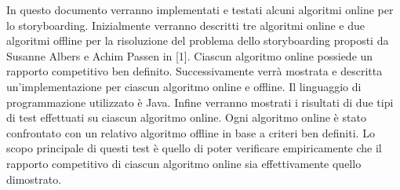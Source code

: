\documentclass[openany,titlepage,fleqn,
	headinclude,12pt,a4paper,BCOR5mm,footinclude]{scrbook}
\begin{document}
In questo documento verranno implementati e testati alcuni algoritmi online per lo storyboarding. Inizialmente verranno descritti tre algoritmi online e due algoritmi offline per la risoluzione del problema dello storyboarding proposti da Susanne Albers e Achim Passen in [1]. Ciascun algoritmo online possiede un rapporto competitivo ben definito. Successivamente verrà mostrata e descritta un'implementazione per ciascun algoritmo online e offline. Il linguaggio di programmazione utilizzato è Java. Infine verranno mostrati i risultati di due tipi di test effettuati su ciascun algoritmo online. Ogni algoritmo online è stato confrontato con un relativo algoritmo offline in base a criteri ben definiti. Lo scopo principale di questi test è quello di poter verificare empiricamente che il rapporto competitivo di ciascun algoritmo online sia effettivamente quello dimostrato.
\end{document}
